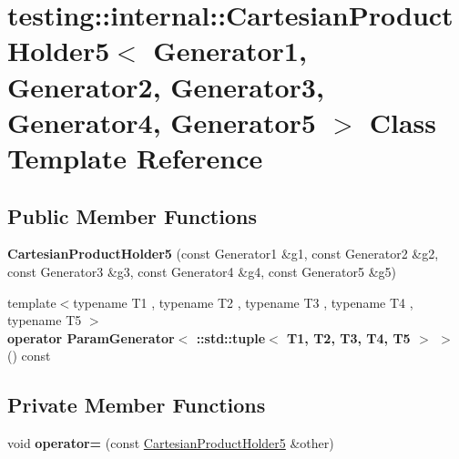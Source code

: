 \hypertarget{classtesting_1_1internal_1_1_cartesian_product_holder5}{}\section{testing\+:\+:internal\+:\+:Cartesian\+Product\+Holder5$<$ Generator1, Generator2, Generator3, Generator4, Generator5 $>$ Class Template Reference}
\label{classtesting_1_1internal_1_1_cartesian_product_holder5}
\subsection*{Public Member Functions}
\begin{DoxyCompactItemize}
\item 
\mbox{\label{classtesting_1_1internal_1_1_cartesian_product_holder5_afb3a413ff0e59f31e621937f968d0923}} 
{\bfseries Cartesian\+Product\+Holder5} (const Generator1 \&g1, const Generator2 \&g2, const Generator3 \&g3, const Generator4 \&g4, const Generator5 \&g5)
\item 
\mbox{\label{classtesting_1_1internal_1_1_cartesian_product_holder5_aff2bd642fe8c52a2b9235e7c9c08cf26}} 
{\footnotesize template$<$typename T1 , typename T2 , typename T3 , typename T4 , typename T5 $>$ }\\{\bfseries operator Param\+Generator$<$ \+::std\+::tuple$<$ T1, T2, T3, T4, T5 $>$ $>$} () const
\end{DoxyCompactItemize}
\subsection*{Private Member Functions}
\begin{DoxyCompactItemize}
\item 
\mbox{\label{classtesting_1_1internal_1_1_cartesian_product_holder5_a2424c5da11b359c55e4f91b75bbb352c}} 
void {\bfseries operator=} (const \mbox{\hyperlink{classtesting_1_1internal_1_1_cartesian_product_holder5}{Cartesian\+Product\+Holder5}} \&other)
\end{DoxyCompactItemize}
